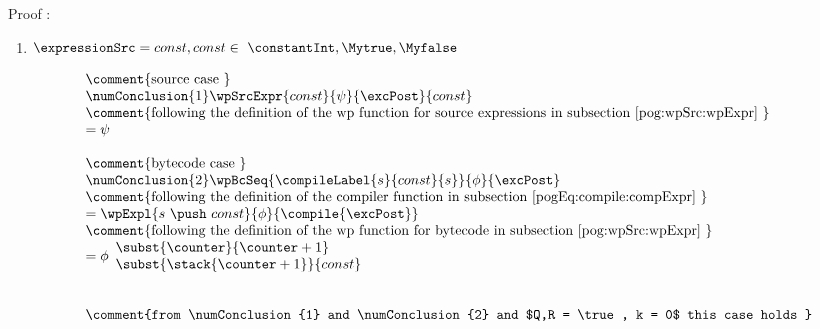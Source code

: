 Proof : \\
 


\begin{enumerate} 
		\item    $\expressionSrc = const , const \in \ \constantInt, \Mytrue, \Myfalse $
                     
		     $$ \begin{array}{l}  
		               \mbox{\rm\comment{source case }} \\
		              \numConclusion{1} \wpSrcExpr{ const}{\psi}{ \excPost}{const}  \\
		    	       \mbox{\rm\comment{following the definition of the wp function for source expressions in subsection  \ref{pog:wpSrc:wpExpr} }} \\
			       = \psi \\
			       \\
			       \mbox{\rm\comment{bytecode case }} \\
		               \numConclusion{2} \wpBcSeq{\compileLabel{s}{const}{s} }{\phi}{ \excPost}  \\
			
		    	       \mbox{\rm\comment{following the definition   of the compiler function in subsection \ref{pogEq:compile:compExpr} }} \\
			       = \wpExpl{s \ \push \ const }{\phi}{ \compile{\excPost}}  \\
			       \mbox{\rm\comment{following the definition of the wp function for bytecode in subsection \ref{pog:wpSrc:wpExpr}  }} \\
			       = \phi \begin{array}{l}
                                                \subst{ \counter }{ \counter + 1}\\
						\subst{\stack{ \counter +1} }{const  }
					    \end{array} \\
			        \\
				\\
				 \mbox{\rm\comment{from \numConclusion{1} and   \numConclusion{2} and $Q,R = \true , k = 0$ this case holds   }} \\
					 
				    
			\end{array}$$
                        
			
			

\end{enumerate}
